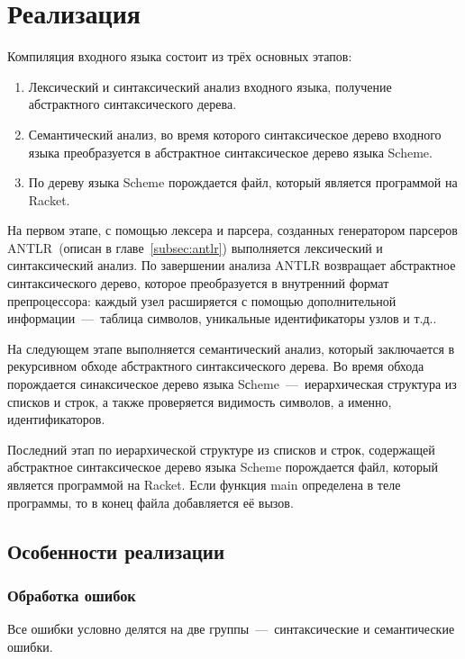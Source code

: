\documentclass[12pt,a4paper,oneside]{extarticle}
\begin{document}
\section{Реализация}
    Компиляция входного языка состоит из трёх основных этапов: 
    \begin{enumerate}
        \item Лексический и синтаксический анализ входного языка, получение абстрактного синтаксического дерева.
        \item Семантический анализ, во время которого синтаксическое дерево входного языка преобразуется в абстрактное синтаксическое дерево языка Scheme.
        \item По дереву языка Scheme порождается файл, который является программой на Racket.
    \end{enumerate}

    На первом этапе, с помощью лексера и парсера, созданных генератором парсеров ANTLR~(описан в главе~\ref{subsec:antlr}) выполняется лексический и синтаксический анализ.
    По завершении анализа ANTLR возвращает абстрактное синтаксического дерево, которое преобразуется в внутренний формат препроцессора: каждый узел расширяется с помощью дополнительной информации~---~таблица символов, уникальные идентификаторы узлов и т.д..

    На следующем этапе выполняется семантический анализ, который заключается в рекурсивном обходе абстрактного синтаксического дерева.
    Во время обхода порождается синаксическое дерево языка Sсheme~---~иерархическая структура из списков и строк, а также проверяется видимость символов, а именно, идентификаторов.

    Последний этап по иерархической структуре из списков и строк, содержащей абстрактное синтаксическое дерево языка Scheme порождается файл, который является программой на Racket.
    Если функция main определена в теле программы, то в конец файла добавляется её вызов.

    \clearpage

    \subsection{Особенности реализации}
        \subsubsection{Обработка ошибок}
            Все ошибки условно делятся на две группы~---~синтаксические и семантические ошибки.
\end{document}
